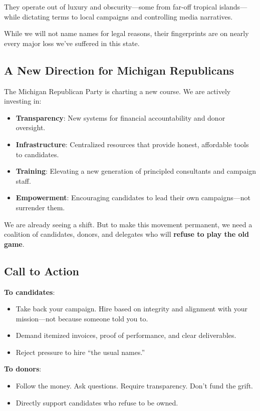 They operate out of luxury and obscurity---some from far-off tropical islands---while dictating terms to local campaigns and controlling media narratives.

While we will not name names for legal reasons, their fingerprints are on nearly every major loss we’ve suffered in this state.

\subsection{A New Direction for Michigan Republicans}
The Michigan Republican Party is charting a new course. We are actively investing in:
\begin{itemize}
\item \textbf{Transparency}: New systems for financial accountability and donor oversight.
\item \textbf{Infrastructure}: Centralized resources that provide honest, affordable tools to candidates.
\item \textbf{Training}: Elevating a new generation of principled consultants and campaign staff.
\item \textbf{Empowerment}: Encouraging candidates to lead their own campaigns---not surrender them.
\end{itemize}

We are already seeing a shift. But to make this movement permanent, we need a coalition of candidates, donors, and delegates who will \textbf{refuse to play the old game}.

\subsection{Call to Action}
\textbf{To candidates}:
\begin{itemize}
\item Take back your campaign. Hire based on integrity and alignment with your mission---not because someone told you to.
\item Demand itemized invoices, proof of performance, and clear deliverables.
\item Reject pressure to hire “the usual names.”
\end{itemize}

\textbf{To donors}:
\begin{itemize}
\item Follow the money. Ask questions. Require transparency. Don’t fund the grift.
\item Directly support candidates who refuse to be owned.
\end{itemize}

